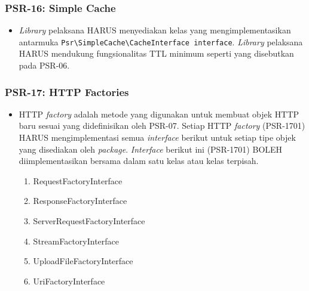 \subsubsection{PSR-16: Simple Cache}
\label{subsubsec:psr16}
\begin{itemize}
	\item \textit{Library} pelaksana HARUS menyediakan kelas yang mengimplementasikan antarmuka \verb|Psr\SimpleCache\CacheInterface interface|. \textit{Library} pelaksana HARUS mendukung fungsionalitas TTL minimum seperti yang disebutkan pada PSR-06.
	
\end{itemize}

\subsubsection{PSR-17: HTTP Factories}
\label{subsubsec:psr17}
\begin{itemize}
	\item HTTP \textit{factory} adalah metode yang digunakan untuk membuat objek HTTP baru sesuai yang didefinisikan oleh PSR-07. Setiap HTTP \textit{factory} (PSR-1701) HARUS mengimplementasi semua \textit{interface} berikut untuk setiap tipe objek yang disediakan oleh \textit{package}. \textit{Interface} berikut ini (PSR-1701) BOLEH diimplementasikan bersama dalam satu kelas atau kelas terpisah.
	\begin{enumerate}
		\item RequestFactoryInterface
		\item ResponseFactoryInterface
		\item ServerRequestFactoryInterface
		\item StreamFactoryInterface
		\item UploadFileFactoryInterface
		\item UriFactoryInterface
	\end{enumerate} 
\end{itemize}

